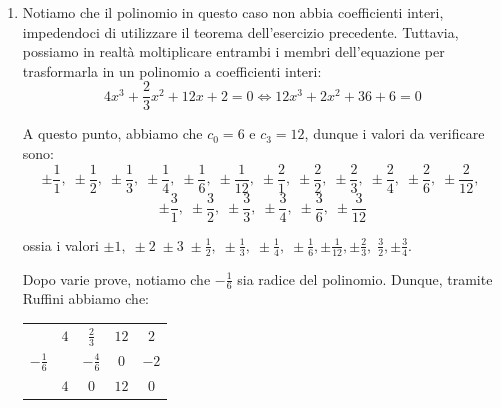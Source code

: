 \documentclass[a4paper, 12pt]{report}
\begin{document}
\begin{enumerate}
        \newpage

        Utilizzando la regola di Ruffini, otteniamo che:
        \begin{center}
            \begin{tabular}{c | c c c| c}
                 & $1$ & $-7$ & $16$ & $-12$\\
            $2$ &       & $2$ & $-10$ & $12$\\
            \hline
                & $1$ & $-5$ & $6$ &  $0$ \\
            \end{tabular}
        \end{center}

        dunque $x^4-6x^3+9x^2+4x-12 = (x+1)(x-2)(x^2-5x+6)$. A questo punto, essendo arrivati ad un polinomio di secondo grado, utilizziamo la formula quadratica per trovare le ultime due radici:
        \[x_{1,2} = \frac{5 \pm \sqrt{25-4\cdot 6}}{2} = \frac{5 \pm 1}{2}\]
        concludendo che $x_1 = 2$ e $x_2 = 3$ e dunque che:
        \[x^4-6x^3+9x^2+4x-12 = (x+1)(x-3)(x-2)^2\]
        
        Per tanto, le soluzioni sono $x \in \{-1, 2, 3\}$.

        \item Notiamo che il polinomio in questo caso non abbia coefficienti interi, impedendoci di utilizzare il teorema dell'esercizio precedente. Tuttavia, possiamo in realtà moltiplicare entrambi i membri dell'equazione per trasformarla in un polinomio a coefficienti interi:
        \[4 x^3 + \frac{2}{3}x^2 + 12 x + 2 = 0 \iff 12x^3+2x^2+36+6 = 0\]

        A questo punto, abbiamo che $c_0 = 6$ e $c_3 = 12$, dunque i valori da verificare sono:
        \[\pm \frac{1}{1}, \; \pm \frac{1}{2}, \; \pm \frac{1}{3}, \; \pm \frac{1}{4}, \; \pm \frac{1}{6}, \; \pm \frac{1}{12}, \; \pm \frac{2}{1}, \; \pm \frac{2}{2}, \; \pm \frac{2}{3}, \; \pm \frac{2}{4}, \; \pm \frac{2}{6}, \; \pm \frac{2}{12}, \;\]
        \[\pm \frac{3}{1}, \; \pm \frac{3}{2}, \; \pm \frac{3}{3}, \; \pm \frac{3}{4}, \; \pm \frac{3}{6}, \; \pm \frac{3}{12}\]

        ossia i valori $\pm 1, \; \pm 2 \; \pm 3\; \pm \frac{1}{2}, \; \pm \frac{1}{3}, \; \pm \frac{1}{4}, \; \pm \frac{1}{6}, \pm \frac{1}{12}, \pm \frac{2}{3},\; \frac{3}{2}, \pm \frac{3}{4}$.

        Dopo varie prove, notiamo che $-\frac{1}{6}$ sia radice del polinomio. Dunque, tramite Ruffini abbiamo che:

        \begin{center}
            \begin{tabular}{c | c c c| c}
                 & $4$ & $\frac{2}{3}$ & $12$ & $2$\\
            $-\frac{1}{6}$ &       & $-\frac{4}{6}$ & $0$ & $-2$\\
            \hline
                & $4$ & $0$ & $12$ &  $0$ \\
            \end{tabular}
        \end{center}


\end{enumerate}
\end{document}
